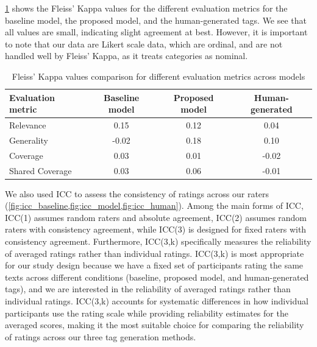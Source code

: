 \cref{tab:fleiss_kappa_comparison} shows the Fleiss' Kappa values for the different evaluation metrics for the baseline model, the proposed model, and the human-generated tags. We see that all values are small, indicating slight agreement at best. However, it is important to note that our data are Likert scale data, which are ordinal, and are not handled well by Fleiss' Kappa, as it treats categories as nominal.

\begin{table}[h]
    \centering
    \begin{tabular}{lccc}
        \hline
        \textbf{Evaluation metric} & \textbf{Baseline model} & \textbf{Proposed model} & \textbf{Human-generated} \\
        \hline
        Relevance                  & 0.15              & 0.12                    & 0.04                     \\
        Generality                 & -0.02             & 0.18                    & 0.10                     \\
        Coverage                   & 0.03              & 0.01                    & -0.02                    \\
        Shared Coverage            & 0.03              & 0.06                    & -0.01                    \\
        \hline
    \end{tabular}
    \caption{Fleiss' Kappa values comparison for different evaluation metrics across models}
    \label{tab:fleiss_kappa_comparison}
\end{table}

We also used ICC to assess the consistency of ratings across our raters (\cref{fig:icc_baseline,fig:icc_model,fig:icc_human}). Among the main forms of ICC, ICC(1) assumes random raters and absolute agreement, ICC(2) assumes random raters with consistency agreement, while ICC(3) is designed for fixed raters with consistency agreement. Furthermore, ICC(3,k) specifically measures the reliability of averaged ratings rather than individual ratings. ICC(3,k) is most appropriate for our study design because we have a fixed set of participants rating the same texts across different conditions (baseline, proposed model, and human-generated tags), and we are interested in the reliability of averaged ratings rather than individual ratings. ICC(3,k) accounts for systematic differences in how individual participants use the rating scale while providing reliability estimates for the averaged scores, making it the most suitable choice for comparing the reliability of ratings across our three tag generation methods.



